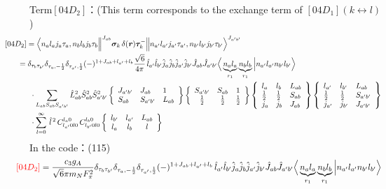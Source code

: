 \documentclass[master]{shnuthesis}
\newcommand{\bmr}{\textbf{\textit{r}}}
\newcommand{\ap}{a^\prime}
\newcommand{\bp}{b^\prime}
\newcommand{\il}{\!\!\!\!\!\!\!\!\!\!}
\newcommand{\ii}{\!\!\!\!\!\!\!\!\!\!\!\!\!\!\!\!\!\!\!\!}
\begin{document}
{\color{red}Term$[04D_2]$：}(This term corresponds to the exchange term of $[04D_1]$$(k \longleftrightarrow l)$)
\begin{align}
    &\ii [04D_2] = \Big\langle n_a l_a j_a \tau_a, n_b l_b j_b \tau_b \Big\|^{J_{ab}} \bm{\sigma}_k \,\delta(\bmr) \bm{\tau}_k^- \Big\| n_{\ap} l_{\ap} j_{\ap} \tau_{\ap}, n_{\bp} l_{\bp} j_{\bp} \tau_{\bp} \Big\rangle^{J_{\ap \bp}} \\
    &\il = \delta_{\tau_b \tau_{\bp}}\delta_{\tau_a, -\frac{1}{2}}\delta_{\tau_{\ap}, \frac{1}{2}} (-)^{1+J_{ab}+l_{\ap}+l_b}\frac{\sqrt{6}}{4\pi}\,\hat{l}_{\ap}\hat{l}_{\bp}\hat{j}_a\hat{j}_b\hat{j}_{\ap}\hat{j}_{\bp}\hat{J}_{ab}\hat{J}_{\ap\bp} \Big\langle \underbrace{n_a l_a}_{r_1} \underbrace{n_b l_b}_{r_1} \Big| n_{\ap} l_{\ap} n_{\bp} l_{\bp} \Big\rangle \notag \\
    & \cdot \sum_{L_{ab}S_{ab}S_{\ap\bp}} \hat{L}_{ab}^2\hat{S}_{ab}^2\hat{S}_{\ap\bp}^2  \left\{\begin{array}{lll} J_{\ap\bp} & J_{ab} & 1 \\ S_{ab} & S_{\ap\bp} & L_{ab} \end{array}\right\}    \left\{\begin{array}{ccc} S_{\ap\bp} & S_{ab} & 1 \\ \frac{1}{2} & \frac{1}{2} & \frac{1}{2} \end{array}\right\}  \left\{\begin{array}{lll}l_{a} & l_{b} & L_{ab} \\ \frac{1}{2} & \frac{1}{2} & S_{ab} \\j_{a} & j_{b} & J_{ab} \end{array}\right\}  \left\{\begin{array}{lll}l_{\ap} & l_{\bp} & L_{ab} \\ \frac{1}{2} & \frac{1}{2} & S_{\ap\bp} \\j_{\ap} & j_{\bp} & J_{\ap\bp} \end{array}\right\}  \notag\\
    & \cdot \sum_{l=0}^\infty \,\hat{l}^{\,2}\,C_{l_{\ap} 0 l 0}^{l_a 0} \,C_{l_{\bp} 0 l 0}^{l_b 0}  \left\{\begin{array}{ccc} l_{\bp} & l_{\ap} & L_{ab} \\ l_a & l_b & l \end{array}\right\}
\end{align}
In the code：(115)
\begin{align}
    &\il {\color{red} [04D_2]} = \frac{c_3g_A}{\sqrt{6}\pi m_N F_{\pi}^2} \delta_{\tau_b \tau_{\bp}}\delta_{\tau_a, -\frac{1}{2}}\delta_{\tau_{\ap}, \frac{1}{2}} (-)^{1+J_{ab}+l_{\ap}+l_b}\,\hat{l}_{\ap}\hat{l}_{\bp}\hat{j}_a\hat{j}_b\hat{j}_{\ap}\hat{j}_{\bp}\hat{J}_{ab}\hat{J}_{\ap\bp} \Big\langle \underbrace{n_a l_a}_{r_1} \underbrace{n_b l_b}_{r_1} \Big| n_{\ap} l_{\ap} n_{\bp} l_{\bp} \Big\rangle \notag \\

\end{align}$$
\end{document}
